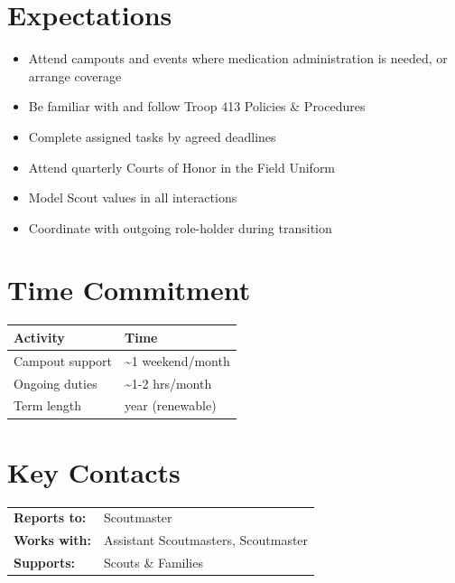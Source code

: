 \documentclass[11pt, letterpaper]{article}
\begin{document}
\hfill
\begin{minipage}[t]{0.48\linewidth}
\raggedright

\section{Expectations}
\begin{itemize}
  \item Attend campouts and events where medication administration is needed, or arrange coverage
  \item Be familiar with and follow Troop 413 Policies \& Procedures
  \item Complete assigned tasks by agreed deadlines
  \item Attend quarterly Courts of Honor in the Field Uniform
  \item Model Scout values in all interactions
  \item Coordinate with outgoing role-holder during transition
\end{itemize}

\section{Time Commitment}
\begin{tabular}{@{}p{3.0cm} >{\raggedright\arraybackslash}p{3.8cm}@{}}
  \toprule
  \textbf{Activity} & \textbf{Time} \\
  \midrule
  Campout support   & \textasciitilde{}1 weekend/month \\
  Ongoing duties    & \textasciitilde{}1-2 hrs/month \\
  Term length       & 1 year (renewable) \\
  \bottomrule
\end{tabular}

\vspace{1em}

\section{Key Contacts}
\begin{tabular}{@{}p{2.6cm} >{\raggedright\arraybackslash}p{4.2cm}@{}}
  \textbf{Reports to:}  & Scoutmaster \\
  \textbf{Works with:}  & Assistant Scoutmasters, Scoutmaster \\
  \textbf{Supports:}    & Scouts \& Families \\
\end{tabular}

\end{minipage}
\end{document}
